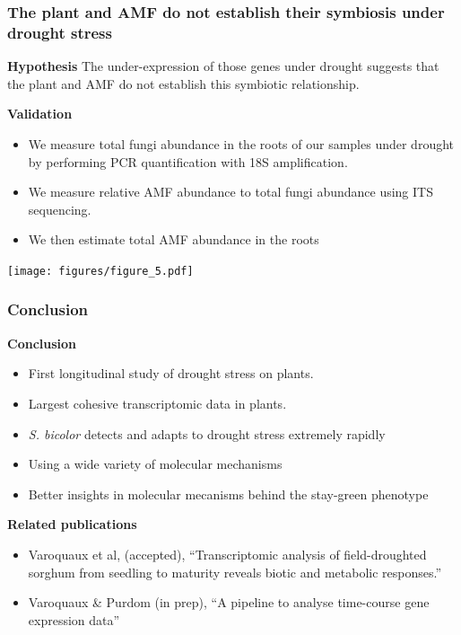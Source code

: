 \documentclass[xcolor=dvipsnames]{beamer}
\begin{document}
\begin{frame}
\frametitle{The plant and AMF do not establish their symbiosis under drought
stress}
{\footnotesize
{\bf Hypothesis} The under-expression of those genes under drought suggests
that the plant and AMF do not establish this symbiotic relationship.}
\vspace{1em}

{\bf Validation}
\begin{itemize}[label={$\bullet$}]
\footnotesize
\item We measure total fungi abundance in the roots of our samples
under drought by performing PCR quantification with 18S amplification.
\item We measure relative AMF abundance to total fungi abundance using ITS
sequencing.
\item We then estimate total AMF abundance in the roots
\end{itemize}

\begin{center}
\texttt{[image: figures/figure\_5.pdf]}
\end{center}
\end{frame}


\begin{frame}
\frametitle{Conclusion}
\textbf{\color{Blue} Conclusion}
\begin{itemize}[label={$\bullet$}]
\item First longitudinal study of drought stress on plants.
\item Largest cohesive transcriptomic data in plants.
\item \textit{S. bicolor} detects and adapts to drought stress extremely rapidly
\item Using a wide variety of molecular mechanisms
\item Better insights in molecular mecanisms behind the stay-green phenotype
\end{itemize}

\vspace{1em}
{\footnotesize
\textbf{\color{Blue} Related publications}
\begin{itemize}[label={$\bullet$}]
\item Varoquaux et al, (accepted), ``Transcriptomic analysis of field-droughted
sorghum from seedling to maturity reveals biotic and metabolic responses.''
\item Varoquaux \& Purdom (in prep), ``A pipeline to analyse time-course gene
expression data''
\end{itemize}}
\end{frame}
\end{document}
